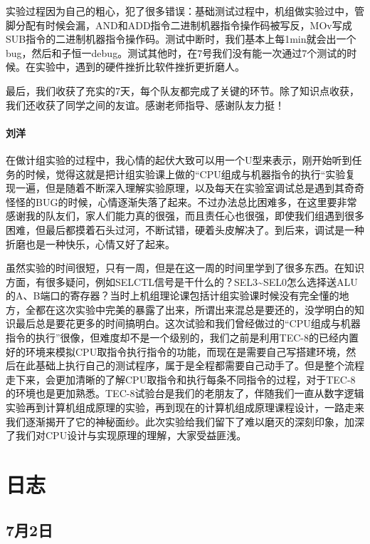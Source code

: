 \documentclass[lang=cn,11pt,a4paper,cite=authornum]{paper}
\begin{document}
实验过程因为自己的粗心，犯了很多错误：基础测试过程中，机组做实验过中，管脚分配有时候会漏，AND和ADD指令二进制机器指令操作码被写反，MOv写成SUB指令的二进制机器指令操作码。测试中断时，我们基本上每1min就会出一个bug，然后和子恒一debug。测试其他时，在7号我们没有能一次通过7个测试的时候。在实验中，遇到的硬件挫折比软件挫折更折磨人。

最后，我们收获了充实的7天，每个队友都完成了关键的环节。除了知识点收获，我们还收获了同学之间的友谊。感谢老师指导、感谢队友力挺！


\paragraph{刘洋}

在做计组实验的过程中，我心情的起伏大致可以用一个U型来表示，刚开始听到任务的时候，觉得这就是把计组实验课上做的“CPU组成与机器指令的执行“实验复现一遍，但是随着不断深入理解实验原理，以及每天在实验室调试总是遇到其奇奇怪怪的BUG的时候，心情逐渐失落了起来。不过办法总比困难多，在这里要非常感谢我的队友们，家人们能力真的很强，而且责任心也很强，即使我们组遇到很多困难，但最后都摸着石头过河，不断试错，硬着头皮解决了。到后来，调试是一种折磨也是一种快乐，心情又好了起来。

虽然实验的时间很短，只有一周，但是在这一周的时间里学到了很多东西。在知识方面，有很多疑问，例如SELCTL信号是干什么的？SEL3\textasciitilde SEL0怎么选择送ALU的A、B端口的寄存器？当时上机组理论课包括计组实验课时候没有完全懂的地方，全都在这次实验中完美的暴露了出来，所谓出来混总是要还的，没学明白的知识最后总是要花更多的时间搞明白。这次试验和我们曾经做过的“CPU组成与机器指令的执行”很像，但难度却不是一个级别的，我们之前是利用TEC-8的已经内置好的环境来模拟CPU取指令执行指令的功能，而现在是需要自己写搭建环境，然后在此基础上执行自己的测试程序，属于是全程都需要自己动手了。但是整个流程走下来，会更加清晰的了解CPU取指令和执行每条不同指令的过程，对于TEC-8的环境也是更加熟悉。TEC-8试验台是我们的老朋友了，伴随我们一直从数字逻辑实验再到计算机组成原理的实验，再到现在的计算机组成原理课程设计，一路走来我们逐渐揭开了它的神秘面纱。此次实验给我们留下了难以磨灭的深刻印象，加深了我们对CPU设计与实现原理的理解，大家受益匪浅。


\appendix

\section{日志}

\subsection{7月2日}
\end{document}
